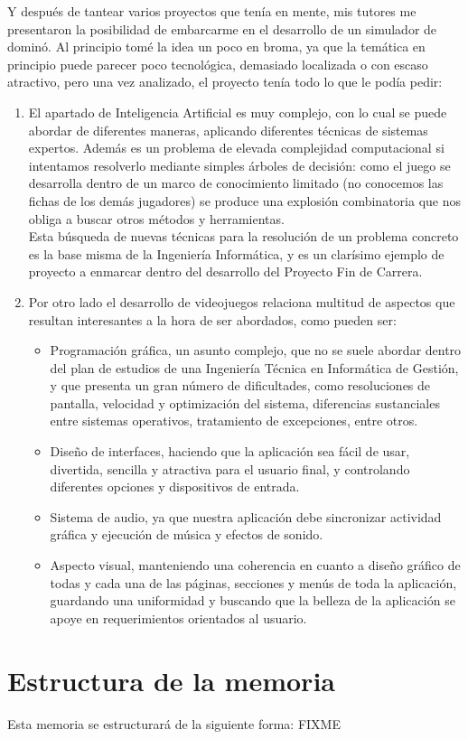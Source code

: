 Y después de tantear varios proyectos que tenía en mente, mis tutores me presentaron la posibilidad
de embarcarme en el desarrollo de un simulador de dominó. Al principio tomé la idea un poco en broma,
ya que la temática en principio puede parecer poco tecnológica, demasiado localizada o con escaso
atractivo, pero una vez analizado, el proyecto tenía todo lo que le podía pedir:
\begin{enumerate}
    \item El apartado de Inteligencia Artificial es muy complejo, con lo cual se puede abordar de
            diferentes maneras, aplicando diferentes técnicas de sistemas expertos. Además es un
            problema de elevada complejidad computacional si intentamos resolverlo mediante simples
            árboles de decisión: como el juego se desarrolla dentro de un marco de conocimiento
            limitado (no conocemos las fichas de los demás jugadores) se produce una explosión
            combinatoria que nos obliga a buscar otros métodos y herramientas.\\
            Esta búsqueda de nuevas técnicas para la resolución de un problema concreto es la base
            misma de la Ingeniería Informática, y es un clarísimo ejemplo de proyecto a enmarcar
            dentro del desarrollo del Proyecto Fin de Carrera.
    \item Por otro lado el desarrollo de videojuegos relaciona multitud de aspectos que resultan
            interesantes a la hora de ser abordados, como pueden ser:
            \begin{itemize}
                \item Programación gráfica, un asunto complejo, que no se suele abordar dentro del
                        plan de estudios de una Ingeniería Técnica en Informática de Gestión, y que
                        presenta un gran número de dificultades, como resoluciones de pantalla, velocidad
                        y optimización del sistema, diferencias sustanciales entre sistemas operativos,
                        tratamiento de excepciones, entre otros.
                \item Diseño de interfaces, haciendo que la aplicación sea fácil de usar, divertida,
                        sencilla y atractiva para el usuario final, y controlando diferentes opciones
                        y dispositivos de entrada.
                \item Sistema de audio, ya que nuestra aplicación debe sincronizar actividad gráfica y
                        ejecución de música y efectos de sonido.
                \item Aspecto visual, manteniendo una coherencia en cuanto a diseño gráfico de todas
                        y cada una de las páginas, secciones y menús de toda la aplicación, guardando
                        una uniformidad y buscando que la belleza de la aplicación se apoye en
                        requerimientos orientados al usuario.
            \end{itemize}
\end{enumerate}

\section{Estructura de la memoria}

Esta memoria se estructurará de la siguiente forma: FIXME
